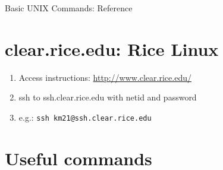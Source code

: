 \documentclass[12pt]{article}
\begin{document}
\begin{center}
{\large Basic UNIX Commands: Reference}
\end{center}

\section{clear.rice.edu: Rice Linux}
\begin{enumerate}
     \item Access instructions: \url{http://www.clear.rice.edu/}
     \item ssh to ssh.clear.rice.edu with netid and password
     \item e.g.: \texttt{ssh km21@ssh.clear.rice.edu}
\end{enumerate}

\section{Useful commands}
\end{document}
